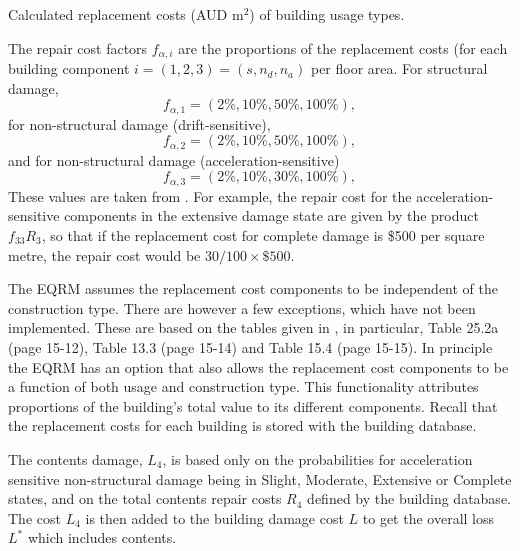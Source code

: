 \begin{table}[p]
\centering \caption{Calculated replacement costs (AUD
$\mathrm{m^2}$) of building
  usage types.}
  \vspace{0.8em}
\label{tab:replace_costs} \small

\end{table}


The repair cost factors $f_{\alpha, i}$
are the proportions of the replacement costs (for each building
component $i=(1,2,3)=(s, n_d, n_a)$  per floor area.
For structural damage,
\begin{equation}
 f_{\alpha, 1} = (2\%, 10\%, 50\%, 100\%),
\end{equation}
for non-structural damage (drift-sensitive),
\begin{equation}
 f_{\alpha, 2} = (2\%, 10\%, 50\%, 100\%),
\end{equation}
and for non-structural damage (acceleration-sensitive)
\begin{equation}
 f_{\alpha, 3} = (2\%, 10\%, 30\%, 100\%),
\end{equation}
These values are taken from \cite{dr_FEMA99b}. For example, the
repair cost for the acceleration-sensitive components in the
extensive damage state are given by the product $f_{33}R_3$, so
that if the replacement cost for complete damage is \$500 per
square metre, the repair cost would be $30/100\times\$500$.


The EQRM assumes the replacement cost components to be
independent of the construction type. There are however a few exceptions,
which have not been implemented. These are based on the tables
given in \cite{dr_FEMA99b}, in particular, Table 25.2a (page
15-12), Table 13.3 (page 15-14) and Table 15.4 (page 15-15). In
principle the EQRM has an option that also allows the replacement
cost components to be a function of both usage and construction
type. This functionality
attributes proportions of the building's total value to its
different components. Recall that the replacement costs for
each building is stored with the building database.

The contents damage, $L_4$, is based only on the probabilities for
acceleration sensitive non-structural damage being in Slight,
Moderate, Extensive or Complete states, and on the total contents
repair costs $R_4$ defined by the building database. The cost $L_4$
is then added to the building damage cost $L$ to get the overall
loss $L^*$ which includes contents.

